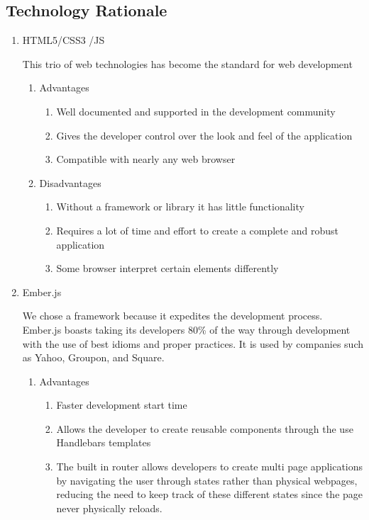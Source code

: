 \subsection{Technology Rationale}
\begin{enumerate}
\item HTML5/CSS3 /JS \par This trio of web technologies has become the standard for web development
\begin{enumerate}
\item Advantages
\begin{enumerate}
\item Well documented and supported in the development community
\item Gives the developer control over the look and feel of the application
\item Compatible with nearly any web browser
\end{enumerate}
\item Disadvantages
\begin{enumerate}
\item Without a framework or library it has little functionality
\item Requires a lot of time and effort to create a complete and robust application
\item Some browser interpret certain elements differently
\end{enumerate}
\end{enumerate}
\item Ember.js \par We chose a framework because it expedites the development process. Ember.js boasts taking its developers 80\% of the way through development with the use of best idioms and proper practices. It is used by companies such as Yahoo, Groupon, and Square.
\begin{enumerate}
\item Advantages
\begin{enumerate}
\item Faster development start time
\item Allows the developer to create reusable components through the use Handlebars templates
\item The built in router allows developers to create multi page applications by navigating the user through states rather than physical webpages, reducing the need to keep track of these different states since the page never physically reloads. 
\end{enumerate}

\end{enumerate}
\end{enumerate}
